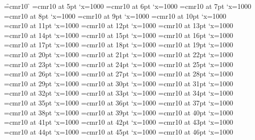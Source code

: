 
\font\f=cmr10 \f
{}\nullfont=5pt
\font\FAAA=cmr10 at 5pt \efcode\FAAA`x=1000
\font\FAAB=cmr10 at 6pt \efcode\FAAB`x=1000
\font\FAAC=cmr10 at 7pt \efcode\FAAC`x=1000
\font\FAAD=cmr10 at 8pt \efcode\FAAD`x=1000
\font\FAAE=cmr10 at 9pt \efcode\FAAE`x=1000
\font\FAAF=cmr10 at 10pt \efcode\FAAF`x=1000
\font\FAAG=cmr10 at 11pt \efcode\FAAG`x=1000
\font\FAAH=cmr10 at 12pt \efcode\FAAH`x=1000
\font\FAAI=cmr10 at 13pt \efcode\FAAI`x=1000
\font\FAAJ=cmr10 at 14pt \efcode\FAAJ`x=1000
\font\FAAK=cmr10 at 15pt \efcode\FAAK`x=1000
\font\FAAL=cmr10 at 16pt \efcode\FAAL`x=1000
\font\FAAM=cmr10 at 17pt \efcode\FAAM`x=1000
\font\FAAN=cmr10 at 18pt \efcode\FAAN`x=1000
\font\FAAO=cmr10 at 19pt \efcode\FAAO`x=1000
\font\FAAP=cmr10 at 20pt \efcode\FAAP`x=1000
\font\FAAQ=cmr10 at 21pt \efcode\FAAQ`x=1000
\font\FAAR=cmr10 at 22pt \efcode\FAAR`x=1000
\font\FAAS=cmr10 at 23pt \efcode\FAAS`x=1000
\font\FAAT=cmr10 at 24pt \efcode\FAAT`x=1000
\font\FAAU=cmr10 at 25pt \efcode\FAAU`x=1000
\font\FAAV=cmr10 at 26pt \efcode\FAAV`x=1000
\font\FAAW=cmr10 at 27pt \efcode\FAAW`x=1000
\font\FAAX=cmr10 at 28pt \efcode\FAAX`x=1000
\font\FAAY=cmr10 at 29pt \efcode\FAAY`x=1000
\font\FAAZ=cmr10 at 30pt \efcode\FAAZ`x=1000
\font\FABA=cmr10 at 31pt \efcode\FABA`x=1000
\font\FABB=cmr10 at 32pt \efcode\FABB`x=1000
\font\FABC=cmr10 at 33pt \efcode\FABC`x=1000
\font\FABD=cmr10 at 34pt \efcode\FABD`x=1000
\font\FABE=cmr10 at 35pt \efcode\FABE`x=1000
\font\FABF=cmr10 at 36pt \efcode\FABF`x=1000
\font\FABG=cmr10 at 37pt \efcode\FABG`x=1000
\font\FABH=cmr10 at 38pt \efcode\FABH`x=1000
\font\FABI=cmr10 at 39pt \efcode\FABI`x=1000
\font\FABJ=cmr10 at 40pt \efcode\FABJ`x=1000
\font\FABK=cmr10 at 41pt \efcode\FABK`x=1000
\font\FABL=cmr10 at 42pt \efcode\FABL`x=1000
\font\FABM=cmr10 at 43pt \efcode\FABM`x=1000
\font\FABN=cmr10 at 44pt \efcode\FABN`x=1000
\font\FABO=cmr10 at 45pt \efcode\FABO`x=1000
\font\FABP=cmr10 at 46pt \efcode\FABP`x=1000
